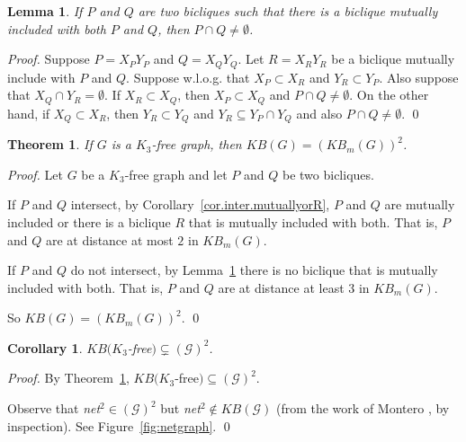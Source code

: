 \documentclass{article}
\newcommand{\margem}[2]
        {\mbox{}\marginpar{%
        \raggedright\textcolor{#2}{%
        \hspace{0pt}\bfseries\ssmall #1\\}}}
\newcommand{\comment}[3]{\margem{\textit{(#1)}\\ #3}{#2}}
\newcommand{\mG}{\ensuremath{\mathcal{G}}}
\newcommand{\net}{\emph{net}}
\newtheorem{theorem}{Theorem}
\newtheorem{lemma}{Lemma}
\newtheorem{corollary}{Corollary}
\begin{document}
\begin{lemma}\label{lem.commonMutually}
  If  $P$ and  $Q$  are two  bicliques  such that  there  is a  biclique
  mutually     included    with     both    $P$     and    $Q$,     then
  $P \cap Q \neq \emptyset$.
\end{lemma}
\begin{proof}
  Suppose $P = X_PY_P$ and $Q = X_QY_Q$.  Let $R = X_RY_R$ be a biclique
  mutually   include  with   $P$   and  $Q$.    Suppose  w.l.o.g.   that
  $X_P \subset X_R$  and $Y_R \subset Y_P$. Also suppose  that $X_Q \cap
  Y_R = \emptyset$. If $X_R \subset  X_Q$, then $X_P \subset X_Q$ and $P
  \cap Q \neq \emptyset$. On the  other hand, if $X_Q \subset X_R$, then
  $Y_R \subset Y_Q$ and $Y_R \subseteq Y_P  \cap Y_Q$ and also $P \cap Q
  \neq \emptyset$.
  \qed
\end{proof}

\begin{theorem}\label{thm.KBm-square}
  If $G$ is a $K_3$-free graph, then $KB(G) = (KB_m(G))^2$.
\end{theorem}
\begin{proof}
  Let $G$ be a $K_3$-free graph and let $P$ and $Q$ be
  two bicliques.

  If  $P$ and  $Q$ intersect,  by Corollary~\ref{cor.inter.mutuallyorR},
  $P$ and $Q$ are mutually included or there is a biclique $R$ that is
  mutually included with  both. That is, $P$ and $Q$  are at distance at
  most $2$ in $KB_m(G)$.

  If  $P$ and  $Q$ do  not intersect,  by Lemma~\ref{lem.commonMutually}
  there is no biclique that is mutually included with both. That is, $P$
  and $Q$ are at distance at least $3$ in $KB_m(G)$.

  So $KB(G) = (KB_m(G))^2$. \qed
\end{proof}

\begin{corollary}
  $KB(K_3$-free$) \subsetneq (\mG)^2$.
\end{corollary}
\begin{proof}
  By Theorem~\ref{thm.KBm-square}, $KB(K_3$-free$) \subseteq  (\mG)^2$.

  Observe that \net$^2  \in (\mG)^2$ but \net$^2  \not\in KB(\mG)$ (from
  the   work  of   Montero  \cite{Montero2008},   by  inspection).   See
  Figure~\ref{fig:netgraph}.
  \qed
\end{proof}
\end{document}
